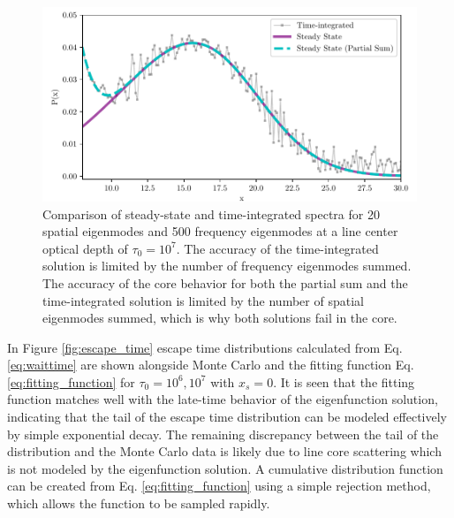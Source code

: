 \documentclass{aastex63}
\begin{document}
\begin{figure}
    \centering
    \includegraphics{steadystate.pdf}
    \caption{Comparison of steady-state and time-integrated spectra for 20 spatial eigenmodes and 500 frequency eigenmodes at a line center optical depth of $\tau_0=10^7$. The accuracy of the time-integrated solution is limited by the number of frequency eigenmodes summed. The accuracy of the core behavior for both the partial sum and the time-integrated solution is limited by the number of spatial eigenmodes summed, which is why both solutions fail in the core.}
    \label{fig:steadystate}
\end{figure}


In Figure \ref{fig:escape_time} escape time distributions calculated from Eq. \ref{eq:waittime} are shown alongside Monte Carlo and the fitting function Eq. \ref{eq:fitting_function} for $\tau_0=10^6, 10^7$ with $x_s=0$. It is seen that the fitting function matches well with the late-time behavior of the eigenfunction solution, indicating that the tail of the escape time distribution can be modeled effectively by simple exponential decay. The remaining discrepancy between the tail of the distribution and the Monte Carlo data is likely due to line core scattering which is not modeled by the eigenfunction solution. A cumulative distribution function can be created from Eq. \ref{eq:fitting_function} using a simple rejection method, which allows the function to be sampled rapidly.
\end{document}
